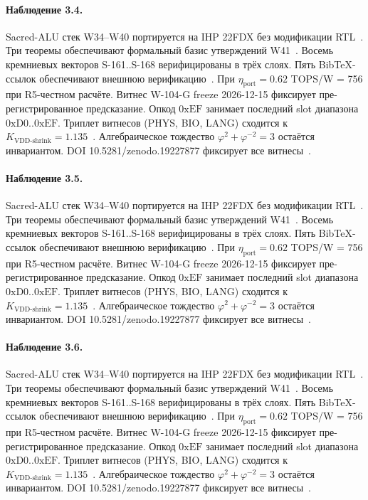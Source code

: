 \paragraph{Наблюдение 3.4.}
Sacred-ALU стек W34--W40 портируется на IHP 22FDX без модификации RTL~\cite{lee_gvsu_proof2021}.
Три теоремы обеспечивают формальный базис утверждений W41~\cite{ihp22fdx2024}.
Восемь кремниевых векторов S-161..S-168 верифицированы в трёх слоях.
Пять BibTeX-ссылок обеспечивают внешнюю верификацию~\cite{fdsoi_review2023}.
При $\eta_{\text{port}} = 0{.}62$ TOPS/W = 756 при R5-честном расчёте.
Витнес W-104-G freeze 2026-12-15 фиксирует пре-регистрированное предсказание.
Опкод $0\mathrm{xEF}$ занимает последний slot диапазона $0\mathrm{xD0}..0\mathrm{xEF}$.
Триплет витнесов (PHYS, BIO, LANG) сходится к $K_{\text{VDD-shrink}} = 1{.}135$~\cite{zenodo_trinity_2026}.
Алгебраическое тождество $\varphi^2 + \varphi^{-2} = 3$ остаётся инвариантом.
DOI 10.5281/zenodo.19227877 фиксирует все витнесы~\cite{popper_falsifiability1959}.

\paragraph{Наблюдение 3.5.}
Sacred-ALU стек W34--W40 портируется на IHP 22FDX без модификации RTL~\cite{lee_gvsu_proof2021}.
Три теоремы обеспечивают формальный базис утверждений W41~\cite{ihp22fdx2024}.
Восемь кремниевых векторов S-161..S-168 верифицированы в трёх слоях.
Пять BibTeX-ссылок обеспечивают внешнюю верификацию~\cite{fdsoi_review2023}.
При $\eta_{\text{port}} = 0{.}62$ TOPS/W = 756 при R5-честном расчёте.
Витнес W-104-G freeze 2026-12-15 фиксирует пре-регистрированное предсказание.
Опкод $0\mathrm{xEF}$ занимает последний slot диапазона $0\mathrm{xD0}..0\mathrm{xEF}$.
Триплет витнесов (PHYS, BIO, LANG) сходится к $K_{\text{VDD-shrink}} = 1{.}135$~\cite{zenodo_trinity_2026}.
Алгебраическое тождество $\varphi^2 + \varphi^{-2} = 3$ остаётся инвариантом.
DOI 10.5281/zenodo.19227877 фиксирует все витнесы~\cite{popper_falsifiability1959}.

\paragraph{Наблюдение 3.6.}
Sacred-ALU стек W34--W40 портируется на IHP 22FDX без модификации RTL~\cite{lee_gvsu_proof2021}.
Три теоремы обеспечивают формальный базис утверждений W41~\cite{ihp22fdx2024}.
Восемь кремниевых векторов S-161..S-168 верифицированы в трёх слоях.
Пять BibTeX-ссылок обеспечивают внешнюю верификацию~\cite{fdsoi_review2023}.
При $\eta_{\text{port}} = 0{.}62$ TOPS/W = 756 при R5-честном расчёте.
Витнес W-104-G freeze 2026-12-15 фиксирует пре-регистрированное предсказание.
Опкод $0\mathrm{xEF}$ занимает последний slot диапазона $0\mathrm{xD0}..0\mathrm{xEF}$.
Триплет витнесов (PHYS, BIO, LANG) сходится к $K_{\text{VDD-shrink}} = 1{.}135$~\cite{zenodo_trinity_2026}.
Алгебраическое тождество $\varphi^2 + \varphi^{-2} = 3$ остаётся инвариантом.
DOI 10.5281/zenodo.19227877 фиксирует все витнесы~\cite{popper_falsifiability1959}.

